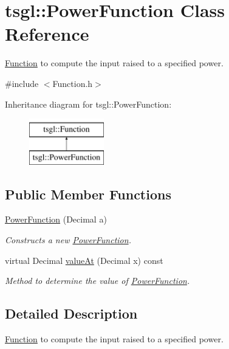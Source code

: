\hypertarget{classtsgl_1_1_power_function}{\section{tsgl\-:\-:\-Power\-Function \-Class \-Reference}
\label{classtsgl_1_1_power_function}
}


\hyperlink{classtsgl_1_1_function}{\-Function} to compute the input raised to a specified power.  




{\ttfamily \#include $<$\-Function.\-h$>$}

\-Inheritance diagram for tsgl\-:\-:\-Power\-Function\-:\begin{figure}[H]
\begin{center}
\leavevmode
\includegraphics[height=2.000000cm]{classtsgl_1_1_power_function}
\end{center}
\end{figure}
\subsection*{\-Public \-Member \-Functions}
\begin{DoxyCompactItemize}
\item 
\hyperlink{classtsgl_1_1_power_function_a0a5d692e9bc9cf2a176ecab4ffc06519}{\-Power\-Function} (\-Decimal a)
\begin{DoxyCompactList}\small\item\em \-Constructs a new \hyperlink{classtsgl_1_1_power_function}{\-Power\-Function}. \end{DoxyCompactList}\item 
virtual \-Decimal \hyperlink{classtsgl_1_1_power_function_ae63821b4c2347508c42c300a0c306076}{value\-At} (\-Decimal x) const 
\begin{DoxyCompactList}\small\item\em \-Method to determine the value of \hyperlink{classtsgl_1_1_power_function}{\-Power\-Function}. \end{DoxyCompactList}\end{DoxyCompactItemize}


\subsection{\-Detailed \-Description}
\hyperlink{classtsgl_1_1_function}{\-Function} to compute the input raised to a specified power. 

